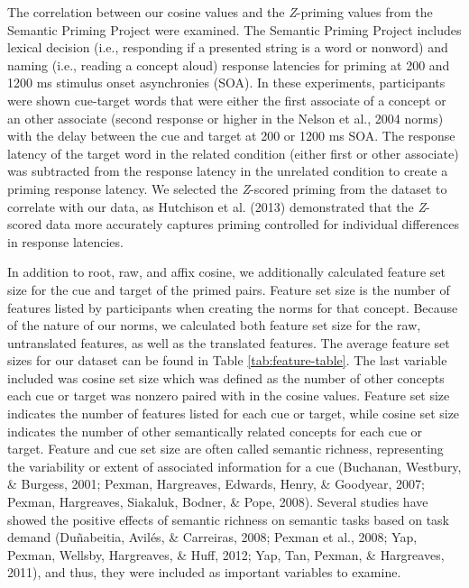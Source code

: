 \documentclass[english,,man]{apa6}
\begin{document}
The correlation between our cosine values and the \emph{Z}-priming values from the Semantic Priming Project were examined. The Semantic Priming Project includes lexical decision (i.e., responding if a presented string is a word or nonword) and naming (i.e., reading a concept aloud) response latencies for priming at 200 and 1200 ms stimulus onset asynchronies (SOA). In these experiments, participants were shown cue-target words that were either the first associate of a concept or an other associate (second response or higher in the Nelson et al., 2004 norms) with the delay between the cue and target at 200 or 1200 ms SOA. The response latency of the target word in the related condition (either first or other associate) was subtracted from the response latency in the unrelated condition to create a priming response latency. We selected the \emph{Z}-scored priming from the dataset to correlate with our data, as Hutchison et al. (2013) demonstrated that the \emph{Z}-scored data more accurately captures priming controlled for individual differences in response latencies.

In addition to root, raw, and affix cosine, we additionally calculated feature set size for the cue and target of the primed pairs. Feature set size is the number of features listed by participants when creating the norms for that concept. Because of the nature of our norms, we calculated both feature set size for the raw, untranslated features, as well as the translated features. The average feature set sizes for our dataset can be found in Table \ref{tab:feature-table}. The last variable included was cosine set size which was defined as the number of other concepts each cue or target was nonzero paired with in the cosine values. Feature set size indicates the number of features listed for each cue or target, while cosine set size indicates the number of other semantically related concepts for each cue or target. Feature and cue set size are often called semantic richness, representing the variability or extent of associated information for a cue (Buchanan, Westbury, \& Burgess, 2001; Pexman, Hargreaves, Edwards, Henry, \& Goodyear, 2007; Pexman, Hargreaves, Siakaluk, Bodner, \& Pope, 2008). Several studies have showed the positive effects of semantic richness on semantic tasks based on task demand (Duñabeitia, Avilés, \& Carreiras, 2008; Pexman et al., 2008; Yap, Pexman, Wellsby, Hargreaves, \& Huff, 2012; Yap, Tan, Pexman, \& Hargreaves, 2011), and thus, they were included as important variables to examine.
\end{document}
